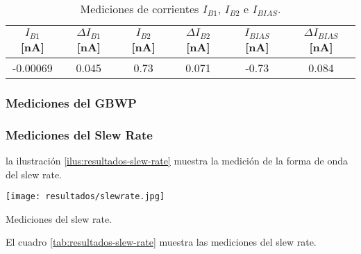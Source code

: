 \begin{table}[h!]
\centering
\begin{tabular}{|c|c|c|c|c|c|}
\hline
$I_{B1}$ [nA] & $\Delta I_{B1}$ [nA] & $I_{B2}$ [nA] & $\Delta I_{B2}$ [nA] & $I_{BIAS}$ [nA] & $\Delta I_{BIAS}$ [nA] \\ \hline
-0.00069 & 0.045 & 0.73 & 0.071 & -0.73 & 0.084 \\ \hline
\end{tabular}
\caption{Mediciones de corrientes $I_{B1}$, $I_{B2}$ e $I_{BIAS}$.}
\label{tab:resultados-corrientes-bias}
\end{table}

\subsubsection{Mediciones del GBWP}

\begin{table}[h!]
\centering
{}
\caption{Mediciones del producto ganancia ancho de banda.}
\label{tab:resultados-gbwp}
\end{table}

\subsubsection{Mediciones del Slew Rate}

la ilustración \ref{ilus:resultados-slew-rate} muestra la medición de la forma de onda del slew rate.

\begin{ilustracion}[htbp]
\centering
\texttt{[image: resultados/slewrate.jpg]}
\caption{Mediciones del slew rate.}
\label{ilus:resultados-slew-rate}
\end{ilustracion}

El cuadro \ref{tab:resultados-slew-rate} muestra las mediciones del slew rate.

